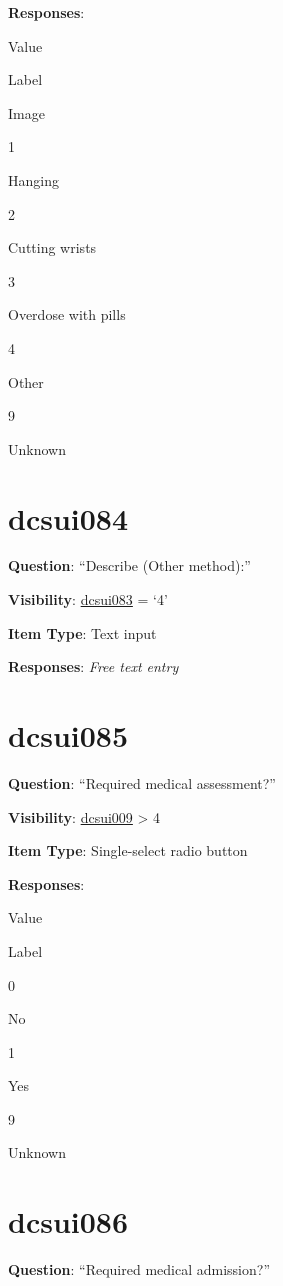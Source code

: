 \documentclass[]{book}
\begin{document}
\textbf{Responses}:

Value

Label

Image

1

Hanging

2

Cutting wrists

3

Overdose with pills

4

Other

9

Unknown

\hypertarget{dcsui084}{%
\section{dcsui084}\label{dcsui084}}

\textbf{Question}: ``Describe (Other method):''

\textbf{Visibility}: \protect\hyperlink{dcsui083}{dcsui083} = `4'

\textbf{Item Type}: Text input

\textbf{Responses}: \emph{Free text entry}

\hypertarget{dcsui085}{%
\section{dcsui085}\label{dcsui085}}

\textbf{Question}: ``Required medical assessment?''

\textbf{Visibility}: \protect\hyperlink{dcsui009}{dcsui009} \textgreater{} 4

\textbf{Item Type}: Single-select radio button

\textbf{Responses}:

Value

Label

0

No

1

Yes

9

Unknown

\hypertarget{dcsui086}{%
\section{dcsui086}\label{dcsui086}}

\textbf{Question}: ``Required medical admission?''
\end{document}
